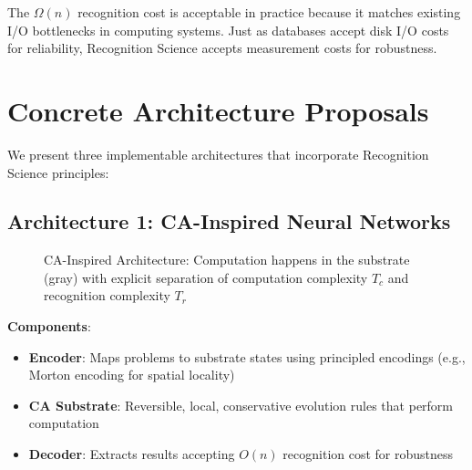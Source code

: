 \documentclass[11pt,letterpaper]{article}
\theoremstyle{plain}
\theoremstyle{definition}
\theoremstyle{remark}
\begin{document}
The $\Omega(n)$ recognition cost is acceptable in practice because it matches existing I/O bottlenecks in computing systems. Just as databases accept disk I/O costs for reliability, Recognition Science accepts measurement costs for robustness.

\section{Concrete Architecture Proposals}
\label{sec:architectures}

We present three implementable architectures that incorporate Recognition Science principles:

\subsection{Architecture 1: CA-Inspired Neural Networks}

\begin{figure}[h]
\centering
{}
\caption{CA-Inspired Architecture: Computation happens in the substrate (gray) with explicit separation of computation complexity $T_c$ and recognition complexity $T_r$}
\label{fig:ca-architecture}
\end{figure}

\textbf{Components}:
\begin{itemize}
\item \textbf{Encoder}: Maps problems to substrate states using principled encodings (e.g., Morton encoding for spatial locality)
\item \textbf{CA Substrate}: Reversible, local, conservative evolution rules that perform computation
\item \textbf{Decoder}: Extracts results accepting $O(n)$ recognition cost for robustness
\end{itemize}
\end{document}
